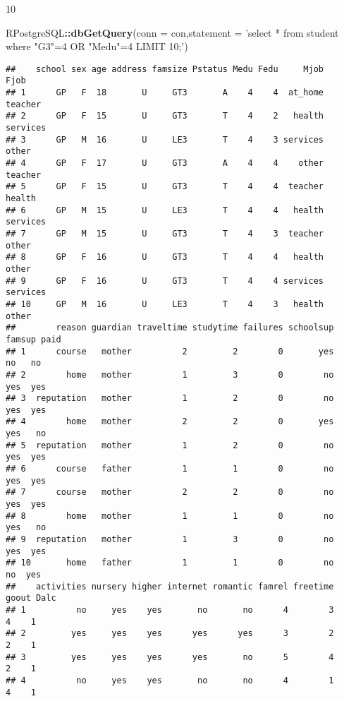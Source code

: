 \documentclass[]{book}
\newenvironment{Shaded}{\begin{snugshade}}{\end{snugshade}}
\newcommand{\KeywordTok}[1]{\textcolor[rgb]{0.13,0.29,0.53}{\textbf{#1}}}
\newcommand{\DataTypeTok}[1]{\textcolor[rgb]{0.13,0.29,0.53}{#1}}
\newcommand{\StringTok}[1]{\textcolor[rgb]{0.31,0.60,0.02}{#1}}
\newcommand{\OperatorTok}[1]{\textcolor[rgb]{0.81,0.36,0.00}{\textbf{#1}}}
\newcommand{\NormalTok}[1]{#1}
\begin{document}
10

\begin{Shaded}
\begin{Highlighting}[]
\NormalTok{RPostgreSQL}\OperatorTok{::}\KeywordTok{dbGetQuery}\NormalTok{(}\DataTypeTok{conn =}\NormalTok{ con,}\DataTypeTok{statement =} \StringTok{'select * from student where "G3"=4 OR "Medu"=4 LIMIT 10;'}\NormalTok{)}
\end{Highlighting}
\end{Shaded}

\begin{verbatim}
##    school sex age address famsize Pstatus Medu Fedu     Mjob     Fjob
## 1      GP   F  18       U     GT3       A    4    4  at_home  teacher
## 2      GP   F  15       U     GT3       T    4    2   health services
## 3      GP   M  16       U     LE3       T    4    3 services    other
## 4      GP   F  17       U     GT3       A    4    4    other  teacher
## 5      GP   F  15       U     GT3       T    4    4  teacher   health
## 6      GP   M  15       U     LE3       T    4    4   health services
## 7      GP   M  15       U     GT3       T    4    3  teacher    other
## 8      GP   F  16       U     GT3       T    4    4   health    other
## 9      GP   F  16       U     GT3       T    4    4 services services
## 10     GP   M  16       U     LE3       T    4    3   health    other
##        reason guardian traveltime studytime failures schoolsup famsup paid
## 1      course   mother          2         2        0       yes     no   no
## 2        home   mother          1         3        0        no    yes  yes
## 3  reputation   mother          1         2        0        no    yes  yes
## 4        home   mother          2         2        0       yes    yes   no
## 5  reputation   mother          1         2        0        no    yes  yes
## 6      course   father          1         1        0        no    yes  yes
## 7      course   mother          2         2        0        no    yes  yes
## 8        home   mother          1         1        0        no    yes   no
## 9  reputation   mother          1         3        0        no    yes  yes
## 10       home   father          1         1        0        no     no  yes
##    activities nursery higher internet romantic famrel freetime goout Dalc
## 1          no     yes    yes       no       no      4        3     4    1
## 2         yes     yes    yes      yes      yes      3        2     2    1
## 3         yes     yes    yes      yes       no      5        4     2    1
## 4          no     yes    yes       no       no      4        1     4    1

\end{verbatim}
\end{document}
